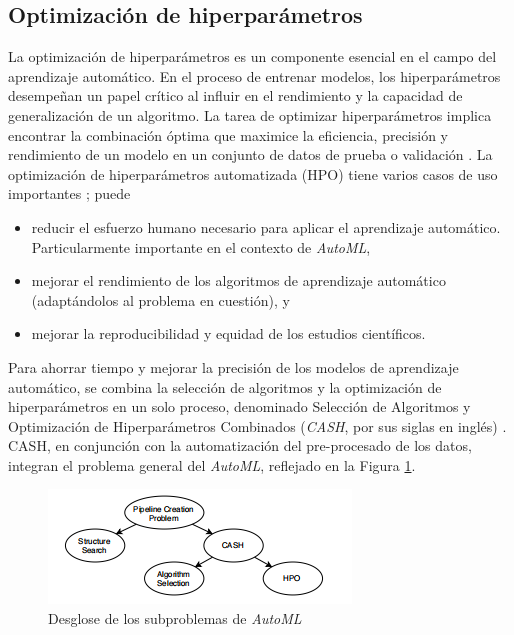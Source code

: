 \subsection{Optimización de hiperparámetros} \label{epig:hpo}
La optimización de hiperparámetros es un componente esencial en el campo del aprendizaje automático. En el proceso de entrenar modelos, los hiperparámetros desempeñan un papel crítico al influir en el rendimiento y la capacidad de generalización de un algoritmo. La tarea de optimizar hiperparámetros implica encontrar la combinación óptima que maximice la eficiencia, precisión y rendimiento de un modelo en un conjunto de datos de prueba o validación  \citep{hastie2009elements}. La optimización de hiperparámetros automatizada (HPO) tiene varios casos de uso importantes  \citep{hutter2019automated}; puede
\begin{itemize}
	\item reducir el esfuerzo humano necesario para aplicar el aprendizaje automático. Particularmente importante en el contexto de \textit{AutoML},
	\item mejorar el rendimiento de los algoritmos de aprendizaje automático (adaptándolos al problema en cuestión), y
	\item mejorar la reproducibilidad y equidad de los estudios científicos.
\end{itemize}
Para ahorrar tiempo y mejorar la precisión de los modelos de aprendizaje automático, se combina la selección de algoritmos y la optimización de hiperparámetros en un solo proceso, denominado Selección de Algoritmos y Optimización de Hiperparámetros Combinados (\textit{CASH}, por sus siglas en inglés) \citep{tuggener2019automated}. CASH, en conjunción con la automatización del pre-procesado de los datos, integran el problema general del \textit{AutoML}, reflejado en la Figura \ref{fig:desglose-de-los-subproblemas-de-automl}. 

\begin{figure}[H]
	\centering
	\includegraphics[width=0.4\linewidth]{"figuras/capi 1/Desglose de los subproblemas de AutoML"}
	\caption{Desglose de los subproblemas de \textit{AutoML} \citep{zoller2021benchmark}}
	\label{fig:desglose-de-los-subproblemas-de-automl}
\end{figure} 


